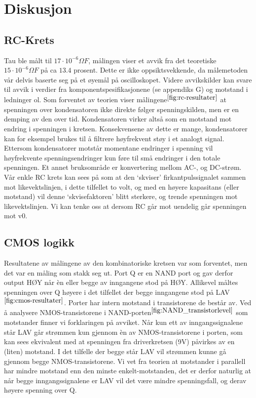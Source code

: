 \section{Diskusjon}

\subsection{RC-Krets}

    Tau ble målt til $17 \cdot 10^{-6} \Omega F$, målingen viser et avvik fra det teoretiske $15 \cdot 10^{-6} \Omega F$ på ca $13.4$ prosent.
    Dette er ikke oppsiktsvekkende, da målemetoden vår delvis baserte seg på et øyemål på oscilloskopet.
    Videre avvikskilder kan svare til avvik i verdier fra komponentspesifikasjonene (se appendiks G) og motstand i ledninger ol.
    Som forventet av teorien viser målingene$^{\ref{fig:rc-resultater}}$ at spenningen over kondensatoren ikke direkte følger spenningskilden, men er en demping av den over tid.
    Kondensatoren virker altså som en motstand mot endring i spenningen i kretsen.
    Konsekvensene av dette er mange, kondensatorer kan for eksempel brukes til å filtrere høyfrekvent støy i et analogt signal.
    Ettersom kondensatorer motstår momentane endringer i spenning vil høyfrekvente spenningsendringer kun føre til små endringer i den totale spenningen.
    Et annet bruksområde er konvertering mellom AC-, og DC-strøm.
    Vår enkle RC krets kan sees på som at den ‘skviser’ firkantpulssignalet sammen mot likevektslinjen, i dette tilfellet to volt, og med en høyere kapasitans (eller motstand) vil denne ‘skvisefaktoren’ blitt sterkere, og trende spenningen mot likevektslinjen.
    Vi kan tenke oss at dersom RC går mot uendelig går spenningen mot v0.

\subsection{CMOS logikk}

    Resultatene av målingene av den kombinatoriske kretsen var som forventet, men det var en måling som stakk seg ut.
    Port Q er en NAND port og gav derfor output HØY når èn eller begge av inngangene stod på HØY.
    Allikevel måltes spenningen over Q høyere i det tilfellet der begge inngangene stod på LAV$^{\ref{fig:cmos-resultater}}$.
    Porter har intern motstand i transistorene de består av.
    Ved å analysere NMOS-transistorene i NAND-porten$^{\ref{fig:NAND_transistorlevel}}$ som motstander finner vi forklaringen på avviket.
    Når kun ett av inngangssignalene står LAV går strømmen kun gjennom èn av NMOS-transistorene i porten, som kan sees ekvivalent med at spenningen fra driverkretsen (9V) påvirkes av en (liten) motstand.
    I det tilfelle der begge står LAV vil strømmen kunne gå gjennom begge NMOS-transistorene.
    Vi vet fra teorien at motstander i parallell har mindre motstand enn den minste enkelt-motstanden, det er derfor naturlig at når begge inngangssignalene er LAV vil det være mindre spenningsfall, og derav høyere spenning over Q.

